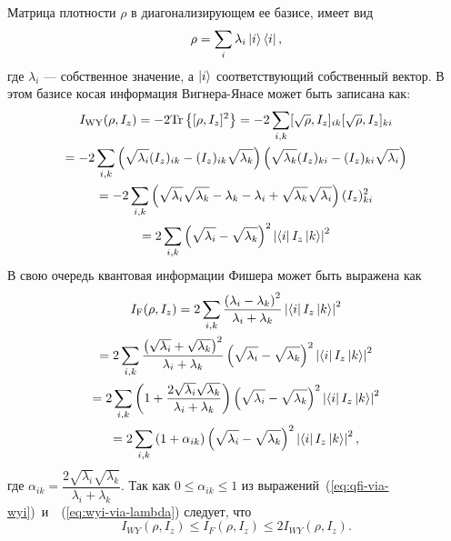 Матрица плотности $\rho$ в диагонализирующем ее базисе,
имеет вид
%
\begin{equation}
  \rho = \sum\limits_i \lambda_i \left| i \right\rangle\left\langle i \right|,
\end{equation}
%
где $\lambda_i$ --- собственное значение,
а $\left| i \right\rangle$ соответствующий собственный вектор.
%
В этом базисе косая информация Вигнера-Янасе может быть записана как:
%
\begin{multline}\label{eq:wyi-via-lambda}
  I_\mathrm{WY}(\rho, I_z)
  = -2 \mathrm{Tr} \left\{ [\rho, I_z]^2 \right\}
  = -2 \sum\limits_{i,k} [\sqrt{\rho}, I_z]_{ik} [\sqrt{\rho}, I_z]_{ki}
  \\
  = -2 \sum\limits_{i,k}
    \left( \sqrt{\lambda_i}(I_z)_{ik} - (I_z)_{ik} \sqrt{\lambda_k} \right)
    \left( \sqrt{\lambda_k}(I_z)_{ki} - (I_z)_{ki} \sqrt{\lambda_i} \right)
  \\
  = -2 \sum\limits_{i,k} \left( 
    \sqrt{\lambda_i}\sqrt{\lambda_k}
    - \lambda_k
    - \lambda_i
    + \sqrt{\lambda_k}\sqrt{\lambda_i}
     \right)
    (I_z)^2_{ki}
  \\
  = 2 \sum\limits_{i,k} \left( \sqrt{\lambda_i} -\sqrt{\lambda_k} \right)^2
    \left| \left\langle i \right| I_z \left| k \right\rangle \right|^2
\end{multline}
%
В свою очередь квантовая информации Фишера может быть выражена как
%
\begin{multline}\label{eq:qfi-via-wyi}
  I_\mathrm{F}(\rho, I_z)
  = 2 \sum\limits_{i,k}
    \dfrac{\left( \lambda_i - \lambda_k \right)^2}{\lambda_i + \lambda_k}
    \left| \left\langle i \right| I_z \left| k \right\rangle \right|^2
  \\
  = 2 \sum\limits_{i,k}
    \dfrac{
      \left( \sqrt{\lambda_i} +\sqrt{\lambda_k} \right)^2
    }{
      \lambda_i + \lambda_k
    }
    \left( \sqrt{\lambda_i} -\sqrt{\lambda_k} \right)^2
    \left| \left\langle i \right| I_z \left| k \right\rangle \right|^2
  \\
  = 2 \sum\limits_{i,k}
    \left( 1 + \dfrac{2\sqrt{\lambda_i}\sqrt{\lambda_k}}{\lambda_i + \lambda_k} \right)
    \left( \sqrt{\lambda_i} -\sqrt{\lambda_k} \right)^2
    \left| \left\langle i \right| I_z \left| k \right\rangle \right|^2
  \\
  = 2 \sum\limits_{i,k} \left( 1 + \alpha_{ik} \right)
  \left( \sqrt{\lambda_i} -\sqrt{\lambda_k} \right)^2
  \left| \left\langle i \right| I_z \left| k \right\rangle \right|^2,
\end{multline}
%
где $\alpha_{ik} = \dfrac{2\sqrt{\lambda_i}\sqrt{\lambda_k}}{\lambda_i + \lambda_k}$.
Так как $ 0 \leq \alpha_{ik} \leq 1$
из выражений~(\ref{eq:qfi-via-wyi})~и~~(\ref{eq:wyi-via-lambda}) следует, что
%
\begin{equation} \label{eq:qfi-wyi-inequality}
    I_{WY}\left(\rho, I_z\right)
    \leq I_F\left(\rho, I_z\right)
    \leq 2I_{WY}\left(\rho, I_z\right).
\end{equation}

